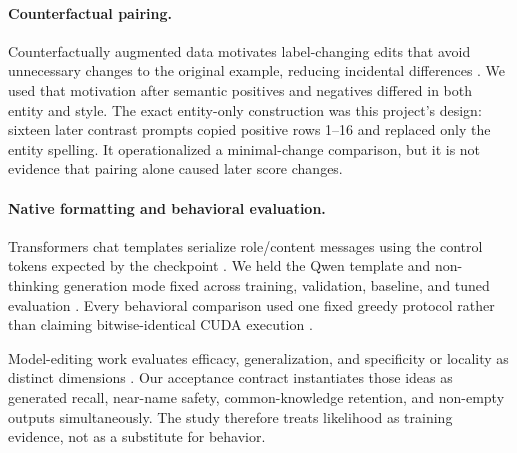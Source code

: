 \paragraph{Counterfactual pairing.}
Counterfactually augmented data motivates label-changing edits that avoid
unnecessary changes to the original example, reducing incidental differences
\citep{kaushik2020cad}. We used that motivation after semantic positives and
negatives differed in both entity and style. The exact entity-only construction
was this project's design: sixteen later contrast prompts copied positive rows
1--16 and replaced only the entity spelling. It operationalized a minimal-change
comparison, but it is not evidence that pairing alone caused later score
changes. %

\paragraph{Native formatting and behavioral evaluation.}
Transformers chat templates serialize role/content messages using the control
tokens expected by the checkpoint \citep{transformerschats}. We held the Qwen
template and non-thinking generation mode fixed across training, validation,
baseline, and tuned evaluation \citep{qwen35,qwen35template}. Every behavioral
comparison used one fixed greedy protocol rather than claiming bitwise-identical CUDA
execution \citep{transformersgeneration,pytorchreproducibility}.

Model-editing work evaluates efficacy, generalization, and specificity or
locality as distinct dimensions \citep{meng2022rome,gangadhar2024model}. Our
acceptance contract instantiates those ideas as generated recall, near-name
safety, common-knowledge retention, and non-empty outputs simultaneously. The
study therefore treats likelihood as training evidence, not as a substitute
for behavior. 
